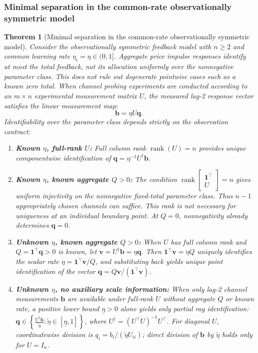 \documentclass[10pt,twocolumn,letterpaper]{article}
\newtheorem{theorem}{Theorem}[section]
\theoremstyle{definition}
\theoremstyle{remark}
\begin{document}
\subsubsection{Minimal separation in the common-rate observationally symmetric model}
\begin{theorem}[Minimal separation in the common-rate observationally symmetric model]
\label{thm:separation}
Consider the observationally symmetric feedback model with $n\ge2$ and common learning rate $\eta_i=\eta\in(0,1]$. Aggregate price impulse responses identify at most the total feedback, not its allocation uniformly over the nonnegative parameter class. This does not rule out degenerate pointwise cases such as a known zero total.
When channel probing experiments are conducted according to an $m \times n$ experimental measurement matrix $U$, the measured lag-2 response vector satisfies the linear measurement map:
\begin{equation}
 \mathbf{b} = \eta U \mathbf{q}.
 \label{eq:channel_measurement_map}
\end{equation}
Identifiability over the parameter class depends strictly on the observation contract:
\begin{enumerate}
    \item \textbf{Known $\eta$, full-rank $U$:} Full column rank $\operatorname{rank}(U) = n$ provides unique componentwise identification of $\mathbf{q} = \eta^{-1} U^\dagger \mathbf{b}$.
    \item \textbf{Known $\eta$, known aggregate $Q>0$:} The condition $\operatorname{rank}\begin{bmatrix} \mathbf{1}^\top \\ U \end{bmatrix}=n$ gives uniform injectivity on the nonnegative fixed-total parameter class. Thus $n-1$ appropriately chosen channels can suffice. This rank is not necessary for uniqueness at an individual boundary point. At $Q=0$, nonnegativity already determines $\mathbf q=0$.
    \item \textbf{Unknown $\eta$, known aggregate $Q > 0$:} When $U$ has full column rank and $Q = \mathbf{1}^\top \mathbf{q} > 0$ is known, let $\mathbf{v} = U^\dagger \mathbf{b} = \eta \mathbf{q}$. Then $\mathbf{1}^\top \mathbf{v} = \eta Q$ uniquely identifies the scalar rate $\eta = \mathbf{1}^\top \mathbf{v} / Q$, and substituting back yields unique point identification of the vector $\mathbf{q} = Q \mathbf{v} / (\mathbf{1}^\top \mathbf{v})$.
    \item \textbf{Unknown $\eta$, no auxiliary scale information:} When only lag-2 channel measurements $\mathbf{b}$ are available under full-rank $U$ without aggregate $Q$ or known rate, a positive lower bound $\underline\eta > 0$ alone yields only partial ray identification: $\mathbf{q} \in \left\{ \frac{U^\dagger \mathbf{b}}{\tilde\eta} : \tilde\eta \in [\underline\eta, 1] \right\}$, where $U^\dagger = (U^\top U)^{-1} U^\top$. For diagonal $U$, coordinatewise division is $q_i = b_i / (\tilde\eta U_{ii})$; direct division of $\mathbf{b}$ by $\tilde\eta$ holds only for $U = I_n$.

\end{enumerate}
\end{theorem}
\end{document}
